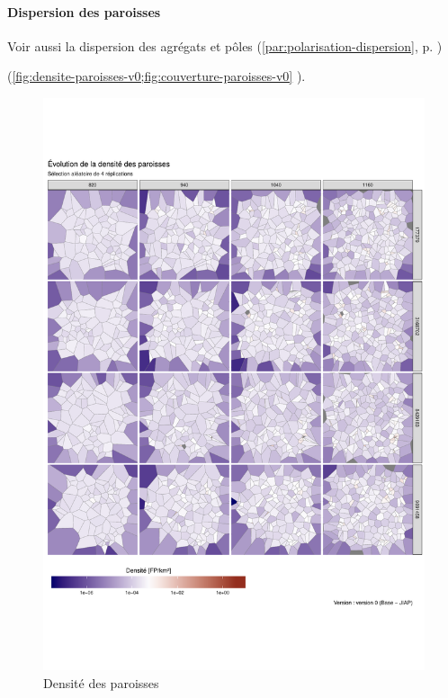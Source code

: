 \paragraph{Dispersion des paroisses}
Voir aussi la dispersion des agrégats et pôles (\autoref{par:polarisation-dispersion}, p. \pageref{par:polarisation-dispersion}) 

\begin{mdframed}[backgroundcolor=gray!10,footnoteinside=false]
	(\cref{fig:densite-paroisses-v0;fig:couverture-paroisses-v0} ).
\end{mdframed}


\begin{figure}[H]
	\captionsetup{width=\linewidth}
	\includegraphics[width=\linewidth]{img/resultats/v0_paroisses_densite.pdf}
	\caption{Densité des paroisses} 
	\label{fig:densite-paroisses-v0} 
\end{figure}



